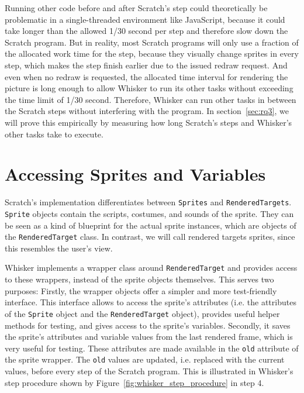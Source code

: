 Running other code before and after Scratch's step could theoretically be problematic in a single-threaded environment like JavaScript,
because it could take longer than the allowed 1/30 second per step and therefore slow down the Scratch program.
But in reality, most Scratch programs will only use a fraction of the allocated work time for the step,
because they visually change sprites in every step, which makes the step finish earlier due to the issued redraw request.
And even when no redraw is requested,
the allocated time interval for rendering the picture is long enough to allow Whisker to run its other tasks without exceeding the time limit of 1/30 second.
Therefore, Whisker can run other tasks in between the Scratch steps without interfering with the program.
In section~\ref{sec:rq3}, we will prove this empirically by measuring how long Scratch's steps and Whisker's other tasks take to execute.

\section{Accessing Sprites and Variables}
\label{sec:accessing_sprites_and_variables}

Scratch's implementation differentiates between \texttt{Sprites} and \texttt{RenderedTargets}.
\texttt{Sprite} objects contain the scripts, costumes, and sounds of the sprite.
They can be seen as a kind of blueprint for the actual sprite instances, which are objects of the \texttt{RenderedTarget} class.
In contrast, we will call rendered targets sprites, since this resembles the user's view.
\parspace

Whisker implements a wrapper class around \texttt{RenderedTarget}
and provides access to these wrappers, instead of the sprite objects themselves.
This serves two purposes:
Firstly, the wrapper objects offer a simpler and more test-friendly interface.
This interface allows to access the sprite's attributes (i.e. the attributes of the \texttt{Sprite} object and the \texttt{RenderedTarget} object),
provides useful helper methods for testing,
and gives access to the sprite's variables.
Secondly, it saves the sprite's attributes and variable values from the last rendered frame,
which is very useful for testing.
These attributes are made available in the \texttt{old} attribute of the sprite wrapper.
The \texttt{old} values are updated, i.e. replaced with the current values,
before every step of the Scratch program.
This is illustrated in Whisker's step procedure shown by Figure~\ref{fig:whisker_step_procedure} in step 4.
\parspace

